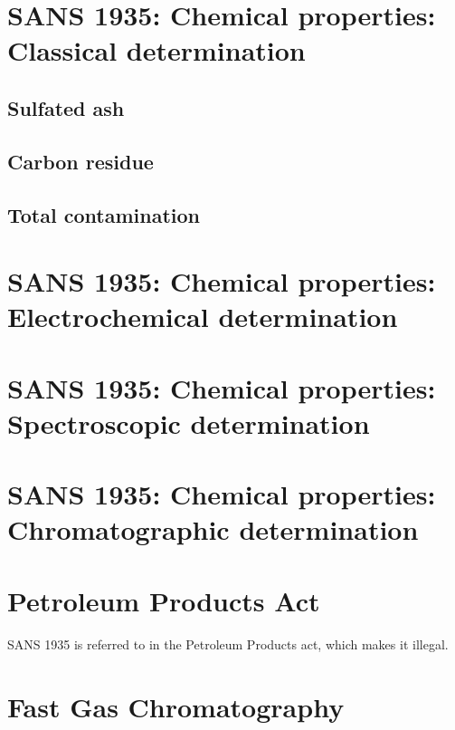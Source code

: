 \section{SANS 1935: Chemical properties: Classical determination}

\subsection{Sulfated ash}

\subsection{Carbon residue}

\subsection{Total contamination}

\section{SANS 1935: Chemical properties: Electrochemical determination}

\section{SANS 1935: Chemical properties: Spectroscopic determination}

\section{SANS 1935: Chemical properties: Chromatographic determination}

\section{Petroleum Products Act}

SANS 1935 is referred to in the Petroleum Products act, which makes it illegal. 

\section{Fast Gas Chromatography}

